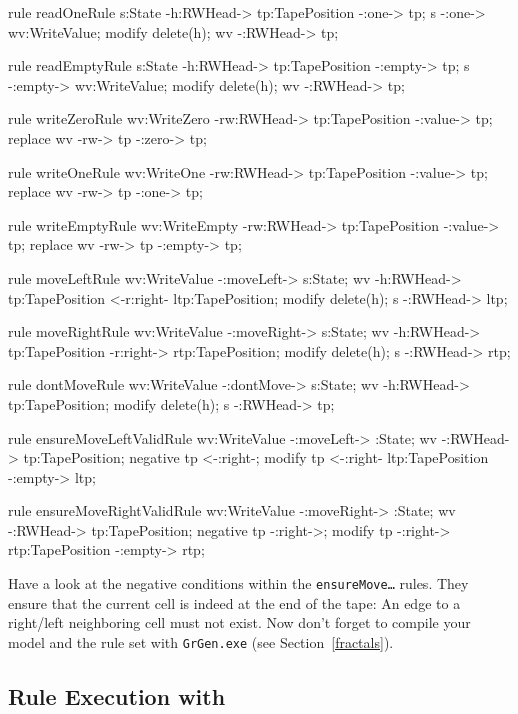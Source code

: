 \begin{grgen}[firstnumber=last]
rule readOneRule {
	s:State -h:RWHead-> tp:TapePosition -:one-> tp;
	s -:one-> wv:WriteValue;
	modify {
		delete(h);
		wv -:RWHead-> tp;
	}
}

rule readEmptyRule {
	s:State -h:RWHead-> tp:TapePosition -:empty-> tp;
	s -:empty-> wv:WriteValue;
	modify {
		delete(h);
		wv -:RWHead-> tp;
	}
}

rule writeZeroRule {
	wv:WriteZero -rw:RWHead-> tp:TapePosition -:value-> tp;
	replace {
		wv -rw-> tp -:zero-> tp;
	}
}

rule writeOneRule {
	wv:WriteOne -rw:RWHead-> tp:TapePosition -:value-> tp;
	replace {
		wv -rw-> tp -:one-> tp;
	}
}

rule writeEmptyRule {
	wv:WriteEmpty -rw:RWHead-> tp:TapePosition -:value-> tp;
	replace {
		wv -rw-> tp -:empty-> tp;
	}
}

rule moveLeftRule {
	wv:WriteValue -:moveLeft-> s:State;
	wv -h:RWHead-> tp:TapePosition <-r:right- ltp:TapePosition;
	modify {
		delete(h);
		s -:RWHead-> ltp;
	}
}

rule moveRightRule {
	wv:WriteValue -:moveRight-> s:State;
	wv -h:RWHead-> tp:TapePosition -r:right-> rtp:TapePosition;
	modify {
		delete(h);
		s -:RWHead-> rtp;
	}
}

rule dontMoveRule {
	wv:WriteValue -:dontMove-> s:State;
	wv -h:RWHead-> tp:TapePosition;
	modify {
		delete(h);
		s -:RWHead-> tp;
	}
}

rule ensureMoveLeftValidRule {
	wv:WriteValue -:moveLeft-> :State;
	wv -:RWHead-> tp:TapePosition;
	negative {
		tp <-:right-;
	}
	modify {
		tp <-:right- ltp:TapePosition -:empty-> ltp;
	}
}

rule ensureMoveRightValidRule {
	wv:WriteValue -:moveRight-> :State;
	wv -:RWHead-> tp:TapePosition;
	negative {
		tp -:right->;
	}
	modify {
		tp -:right-> rtp:TapePosition -:empty-> rtp;
	}
}
\end{grgen}
Have a look at the negative conditions within the \texttt{ensureMove\dots} rules. They ensure that the current cell is indeed at the end of the tape: An edge to a right/left neighboring cell must not exist. Now don't forget to compile your model and the rule set with \texttt{GrGen.exe} (see Section~\ref{fractals}).

\subsection{Rule Execution with \GrShell}

